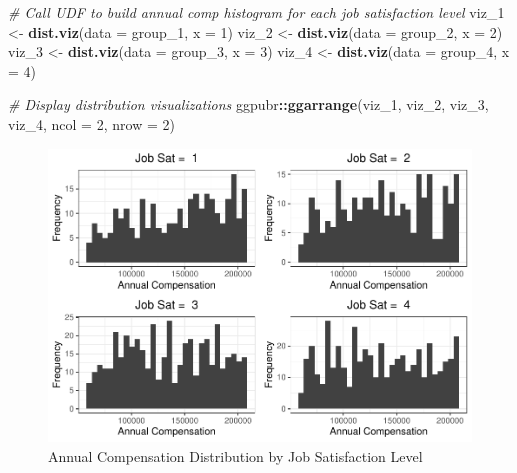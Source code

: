 \documentclass[]{book}
\newenvironment{Shaded}{\begin{snugshade}}{\end{snugshade}}
\newcommand{\CommentTok}[1]{\textcolor[rgb]{0.56,0.35,0.01}{\textit{#1}}}
\newcommand{\DataTypeTok}[1]{\textcolor[rgb]{0.13,0.29,0.53}{#1}}
\newcommand{\DecValTok}[1]{\textcolor[rgb]{0.00,0.00,0.81}{#1}}
\newcommand{\KeywordTok}[1]{\textcolor[rgb]{0.13,0.29,0.53}{\textbf{#1}}}
\newcommand{\NormalTok}[1]{#1}
\newcommand{\OperatorTok}[1]{\textcolor[rgb]{0.81,0.36,0.00}{\textbf{#1}}}
\newcommand{\StringTok}[1]{\textcolor[rgb]{0.31,0.60,0.02}{#1}}
\begin{document}
\begin{Shaded}
\begin{Highlighting}[]
\CommentTok{# Call UDF to build annual comp histogram for each job satisfaction level}
\NormalTok{viz_}\DecValTok{1}\NormalTok{ <-}\StringTok{ }\KeywordTok{dist.viz}\NormalTok{(}\DataTypeTok{data =}\NormalTok{ group_}\DecValTok{1}\NormalTok{, }\DataTypeTok{x =} \DecValTok{1}\NormalTok{)}
\NormalTok{viz_}\DecValTok{2}\NormalTok{ <-}\StringTok{ }\KeywordTok{dist.viz}\NormalTok{(}\DataTypeTok{data =}\NormalTok{ group_}\DecValTok{2}\NormalTok{, }\DataTypeTok{x =} \DecValTok{2}\NormalTok{)}
\NormalTok{viz_}\DecValTok{3}\NormalTok{ <-}\StringTok{ }\KeywordTok{dist.viz}\NormalTok{(}\DataTypeTok{data =}\NormalTok{ group_}\DecValTok{3}\NormalTok{, }\DataTypeTok{x =} \DecValTok{3}\NormalTok{)}
\NormalTok{viz_}\DecValTok{4}\NormalTok{ <-}\StringTok{ }\KeywordTok{dist.viz}\NormalTok{(}\DataTypeTok{data =}\NormalTok{ group_}\DecValTok{4}\NormalTok{, }\DataTypeTok{x =} \DecValTok{4}\NormalTok{)}

\CommentTok{# Display distribution visualizations}
\NormalTok{ggpubr}\OperatorTok{::}\KeywordTok{ggarrange}\NormalTok{(viz_}\DecValTok{1}\NormalTok{, viz_}\DecValTok{2}\NormalTok{, viz_}\DecValTok{3}\NormalTok{, viz_}\DecValTok{4}\NormalTok{,}
          \DataTypeTok{ncol =} \DecValTok{2}\NormalTok{, }\DataTypeTok{nrow =} \DecValTok{2}\NormalTok{)}
\end{Highlighting}
\end{Shaded}

\begin{figure}

{\centering \includegraphics{The_People_Analytics_Companion_files/figure-latex/comp-dist-1} 

}

\caption{Annual Compensation Distribution by Job Satisfaction Level}\label{fig:comp-dist}
\end{figure}
\end{document}
